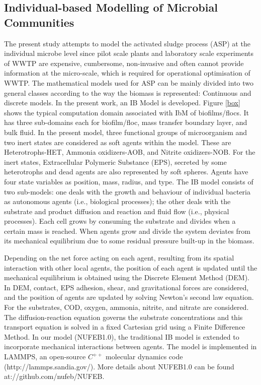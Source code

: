\subsection{Individual-based Modelling of Microbial Communities}
The present study attempts to model the activated sludge process (ASP) at the individual microbe level since pilot scale plants and laboratory scale experiments of WWTP are expensive, cumbersome, non-invasive and often cannot provide information at the micro-scale, which is required for operational optimisation of WWTP. The mathematical models used for ASP can be mainly divided into two general classes according to the way the biomass is represented: Continuous and discrete models. In the present work, an IB Model is developed. Figure \ref{box} shows the typical computation domain associated with IbM of biofilms/flocs. It has three sub-domains each for biofilm/floc, mass transfer boundary layer, and bulk fluid. 
In the present model, three functional groups of microorganism and two inert states are considered as soft agents within the model. These are Heterotrophs-HET, Ammonia oxidizers-AOB, and Nitrite oxidizers-NOB. For the inert states, Extracellular Polymeric Substance (EPS), secreted by some heterotrophs and dead agents are also represented by soft spheres. Agents have four state variables as position, mass, radius, and type. The IB model consists of two sub-models: one deals with the growth and behaviour of individual bacteria as autonomous agents (i.e., biological processes); the other deals with the substrate and product diffusion and reaction and fluid flow (i.e., physical processes). Each cell grows by consuming the substrate and divides when a certain mass is reached. When agents grow and divide the system deviates from its mechanical equilibrium due to some residual pressure built-up in the biomass. 

Depending on the net force acting on each agent, resulting from its spatial interaction with other local agents, the position of each agent is updated until the mechanical equilibrium is obtained using the Discrete Element Method (DEM). In DEM, contact, EPS adhesion, shear, and gravitational forces are considered, and the position of agents are updated by solving Newton’s second law equation. For the substrates, COD, oxygen, ammonia, nitrite, and nitrate are considered. The diffusion-reaction equation governs the substrate concentrations and this transport equation is solved in a fixed Cartesian grid using a Finite Difference Method. In our model (NUFEB1.0), the traditional IB model is extended to incorporate mechanical interactions between agents. The model is implemented in LAMMPS, an open-source $C^{++}$ molecular dynamics code (http://lammps.sandia.gov/). More details about NUFEB1.0 can be found at://github.com/nufeb/NUFEB.    


